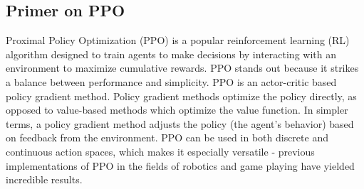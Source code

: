 \documentclass[12pt,oneside,letterpaper]{article}
\begin{document}
\subsection{Primer on PPO}

Proximal Policy Optimization (PPO) is a popular reinforcement learning (RL) algorithm designed to train agents to make decisions by interacting with an environment to maximize cumulative rewards. PPO stands out because it strikes a balance between performance and simplicity. PPO is an actor-critic based  policy gradient method. Policy gradient methods optimize the policy directly, as opposed to value-based methods which optimize the value function. In simpler terms, a policy gradient method adjusts the policy (the agent’s behavior) based on feedback from the environment. PPO can be used in both discrete and continuous action spaces, which makes it especially versatile - previous implementations of PPO in the fields of robotics and game playing have yielded incredible results. \\
\end{document}
